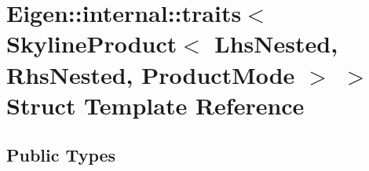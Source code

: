 \hypertarget{struct_eigen_1_1internal_1_1traits_3_01_skyline_product_3_01_lhs_nested_00_01_rhs_nested_00_01_product_mode_01_4_01_4}{}\section{Eigen\+:\+:internal\+:\+:traits$<$ Skyline\+Product$<$ Lhs\+Nested, Rhs\+Nested, Product\+Mode $>$ $>$ Struct Template Reference}
\label{struct_eigen_1_1internal_1_1traits_3_01_skyline_product_3_01_lhs_nested_00_01_rhs_nested_00_01_product_mode_01_4_01_4}
\subsection*{Public Types}
